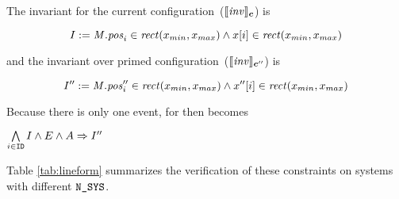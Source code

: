 The invariant for the current configuration~($\llbracket\mathit{inv}\rrbracket_{\mathit{\boldsymbol{c}}}$) is
\begin{small}
\[
I:= \mathit{M.pos}_i \in \mathit{rect}(x_{min}, x_{max}) \wedge x[i] \in \mathit{rect}(x_{min}, x_{max})
\]
\end{small}
and the invariant over primed configuration~($\llbracket\mathit{inv}\rrbracket_{\mathit{\boldsymbol{c}}''}$) is
\begin{small}
\[
I'' := \mathit{M.pos}_i'' \in \mathit{rect}(x_{min}, x_{max}) \wedge x''[i] \in \mathit{rect}(x_{min}, x_{max})
\]
\end{small}
Because there is only one event,  for \LineForm then becomes
\begin{proofob}
\(
\bigwedge\limits_{i\in \texttt{ID}} I \wedge E \wedge A \Rightarrow I''
\)
\end{proofob}

Table \ref{tab:lineform} summarizes the verification of these constraints on systems with different $\texttt{N\_SYS}$.

